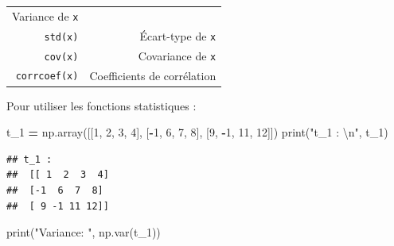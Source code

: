 \documentclass[12pt,]{book}
\newenvironment{Shaded}{\begin{snugshade}}{\end{snugshade}}
\newcommand{\DecValTok}[1]{\textcolor[rgb]{0.00,0.00,0.81}{#1}}
\newcommand{\CharTok}[1]{\textcolor[rgb]{0.31,0.60,0.02}{#1}}
\newcommand{\StringTok}[1]{\textcolor[rgb]{0.31,0.60,0.02}{#1}}
\newcommand{\OperatorTok}[1]{\textcolor[rgb]{0.81,0.36,0.00}{\textbf{#1}}}
\newcommand{\BuiltInTok}[1]{#1}
\newcommand{\NormalTok}[1]{#1}
\numberwithin{equation}{section}
\numberwithin{countremarque}{section}
\begin{document}
\begin{longtable}[]{@{}rr@{}}
\begin{minipage}[t]{0.71\columnwidth}
Variance de \texttt{x}\strut
\end{minipage}\tabularnewline
\begin{minipage}[t]{0.18\columnwidth}\raggedleft\strut
\texttt{std(x)}\strut
\end{minipage} & \begin{minipage}[t]{0.71\columnwidth}\raggedleft\strut
Écart-type de \texttt{x}\strut
\end{minipage}\tabularnewline
\begin{minipage}[t]{0.18\columnwidth}\raggedleft\strut
\texttt{cov(x)}\strut
\end{minipage} & \begin{minipage}[t]{0.71\columnwidth}\raggedleft\strut
Covariance de \texttt{x}\strut
\end{minipage}\tabularnewline
\begin{minipage}[t]{0.18\columnwidth}\raggedleft\strut
\texttt{corrcoef(x)}\strut
\end{minipage} & \begin{minipage}[t]{0.71\columnwidth}\raggedleft\strut
Coefficients de corrélation\strut
\end{minipage}\tabularnewline
\bottomrule
\end{longtable}

Pour utiliser les fonctions statistiques :

\begin{Shaded}
\begin{Highlighting}[]
\NormalTok{t_1 }\OperatorTok{=}\NormalTok{ np.array([[}\DecValTok{1}\NormalTok{, }\DecValTok{2}\NormalTok{, }\DecValTok{3}\NormalTok{, }\DecValTok{4}\NormalTok{], [}\OperatorTok{-}\DecValTok{1}\NormalTok{, }\DecValTok{6}\NormalTok{, }\DecValTok{7}\NormalTok{, }\DecValTok{8}\NormalTok{], [}\DecValTok{9}\NormalTok{, }\OperatorTok{-}\DecValTok{1}\NormalTok{, }\DecValTok{11}\NormalTok{, }\DecValTok{12}\NormalTok{]])}
\BuiltInTok{print}\NormalTok{(}\StringTok{"t_1 : }\CharTok{\textbackslash{}n}\StringTok{"}\NormalTok{, t_1)}
\end{Highlighting}
\end{Shaded}

\begin{lstlisting}
## t_1 : 
##  [[ 1  2  3  4]
##  [-1  6  7  8]
##  [ 9 -1 11 12]]
\end{lstlisting}

\begin{Shaded}
\begin{Highlighting}[]
\BuiltInTok{print}\NormalTok{(}\StringTok{"Variance: "}\NormalTok{, np.var(t_1))}
\end{Highlighting}
\end{Shaded}
\end{document}
